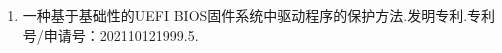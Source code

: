 \begin{APP2}
\begin{enumerate}

    \item 一种基于基础性的UEFI BIOS固件系统中驱动程序的保护方法.发明专利.专利号/申请号：202110121999.5.
    
\end{enumerate}
\end{APP2}

\bjutclearpage